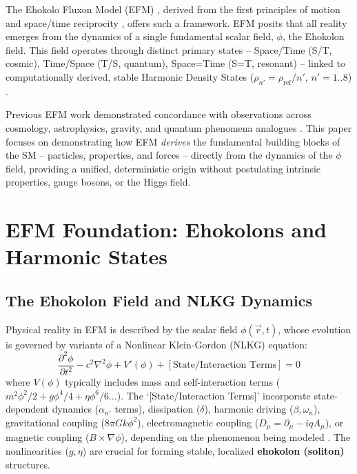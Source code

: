 \documentclass[11pt]{article}
\begin{document}
The Ehokolo Fluxon Model (EFM) \cite{emvula2025compendium}, derived from the first principles of motion and space/time reciprocity \cite{Larson19xx}, offers such a framework. EFM posits that all reality emerges from the dynamics of a single fundamental scalar field, \(\phi\), the Ehokolon field. This field operates through distinct primary states – Space/Time (S/T, cosmic), Time/Space (T/S, quantum), Space=Time (S=T, resonant) – linked to computationally derived, stable Harmonic Density States (\(\rho_{n'} = \rho_{\text{ref}}/n'\), \(n'=1..8\)) \cite{EFM_Harmonic_Densities}.

Previous EFM work demonstrated concordance with observations across cosmology, astrophysics, gravity, and quantum phenomena analogues \cite{EFM_Cosmology, EFM_Unifying_Cosmo, EFM_BH_NonSingular, EFM_QM_Measurement}. This paper focuses on demonstrating how EFM \textit{derives} the fundamental building blocks of the SM – particles, properties, and forces – directly from the dynamics of the \(\phi\) field, providing a unified, deterministic origin without postulating intrinsic properties, gauge bosons, or the Higgs field.

\section{EFM Foundation: Ehokolons and Harmonic States}
\subsection{The Ehokolon Field and NLKG Dynamics}
Physical reality in EFM is described by the scalar field \(\phi(\vec{r}, t)\), whose evolution is governed by variants of a Nonlinear Klein-Gordon (NLKG) equation:
\begin{equation}
\frac{\partial^2 \phi}{\partial t^2} - c^2 \nabla^2 \phi + V'(\phi) + [\text{State/Interaction Terms}] = 0
\label{eq:efm_nlkg_general}
\end{equation}
where \(V(\phi)\) typically includes mass and self-interaction terms (\(m^2\phi^2/2 + g\phi^4/4 + \eta\phi^6/6 \dots\)). The `[State/Interaction Terms]' incorporate state-dependent dynamics (\(\alpha_{n'}\) terms), dissipation (\(\delta\)), harmonic driving (\(\beta, \omega_n\)), gravitational coupling (\(8\pi Gk\phi^2\)), electromagnetic coupling (\(D_\mu = \partial_\mu - iqA_\mu\)), or magnetic coupling (\(B \times \nabla \phi\)), depending on the phenomenon being modeled \cite{emvula2025compendium}. The nonlinearities (\(g, \eta\)) are crucial for forming stable, localized \textbf{ehokolon (soliton)} structures.
\end{document}
